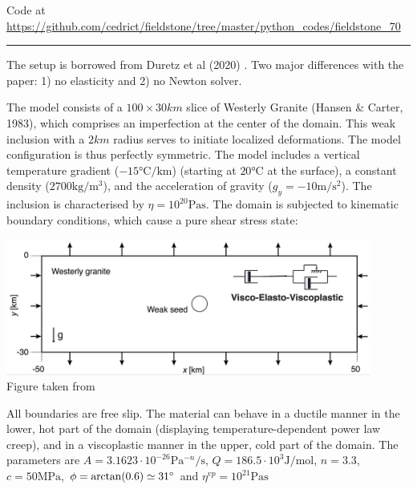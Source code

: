 

\begin{center}
Code at \url{https://github.com/cedrict/fieldstone/tree/master/python_codes/fieldstone_70}
\end{center}

\par\noindent\rule{\textwidth}{0.4pt}


The setup is borrowed from Duretz et al (2020) \cite{dudy20}. 
Two major differences with the paper: 1) no elasticity and 2) no Newton solver.

The model consists of a $100\times 30\si{km}$ slice of Westerly Granite (Hansen \& Carter, 1983), 
which comprises an imperfection at the center of the domain.
This weak inclusion with a $2\si{km}$ radius serves to initiate
localized deformations. The model configuration is thus perfectly symmetric. 
The model includes a vertical temperature gradient ($-15\si{\celsius\per\km}$) (starting 
at $20\si{\celsius}$ at the surface), 
a constant density ($2700\si{\kg\per\cubic\metre}$), and the acceleration of gravity ($g_y=-10\si{\metre\per\second\squared}$).
The inclusion is characterised by $\eta=10^{20}\si{\pascal\second}$.
The domain is subjected to kinematic boundary conditions, which cause a pure shear stress state:

\begin{center}
\includegraphics[width=12cm]{python_codes/fieldstone_70/images/fig1}\\
{\captionfont Figure taken from \cite{dudy20}}
\end{center}

All boundaries are free slip. The material can behave in a ductile manner in the lower, hot
part of the domain (displaying temperature-dependent power law creep), and in a viscoplastic 
manner in the upper, cold part of the domain. The parameters are 
$A=3.1623\cdot 10^{-26}\si{\pascal^{-n}\per\second}$, 
$Q=186.5\cdot 10^3 \si{\joule\per\mole}$, 
$n=3.3$, $c=50\si{\mega\pascal}$, $\phi=\arctan(0.6)\simeq 31\degree$ and $\eta^{vp}=10^{21}\si{\pascal\second}$

